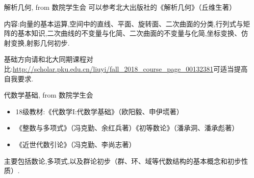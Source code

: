 \documentclass[pdf]{beamer}
\numberwithin{equation}{section}
\theoremstyle{plain}
\theoremstyle{plain}
\theoremstyle{plain}
\theoremstyle{remark}
\begin{document}
\begin{frame}{解析几何, from 数院学生会}
\hspace*{20pt}可以参考北大出版社的《解析几何》（丘维生著）

\hspace*{20pt}内容:向量的基本运算,空间中的直线、平面、旋转面、二次曲面的分类,行列式与矩阵的基本知识,二次曲线的不变量与化简、二次曲面的不变量与化简,坐标变换、仿射变换,射影几何初步.

\hspace*{20pt}基础方向请和北大同期课程对比:\url{http://scholar.pku.edu.cn/liuyi/fall_2018_course_page_00132381}可适当提高自我要求.
\end{frame}
\begin{frame}{代数学基础, from 数院学生会}
\begin{itemize}
	\item 18级教材:《代数学I:代数学基础》（欧阳毅、申伊塃著）
	\item 《整数与多项式》（冯克勤、余红兵著）《初等数论》（潘承洞、潘承彪著）
	\item 《近世代数引论》（冯克勤、李尚志著）
\end{itemize}

\hspace*{20pt}主要包括数论,多项式,以及群论初步（群、环、域等代数结构的基本概念和初步性质）.
\end{frame}
\end{document}
